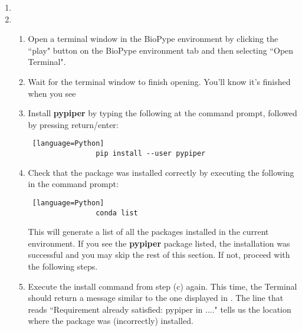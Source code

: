 \begin{enumerate}
\begin{figure}[hbtp]
\begin{center}
        \label{anaconda-install-pack}
        \end{center}
    \end{figure}
        \item {}
        \item {}
        \begin{enumerate}
            \item Open a terminal window in the BioPype environment by clicking the ``play" button on the BioPype environment tab and then selecting ``Open Terminal".
            \item Wait for the terminal window to finish opening. You'll know it's finished when you see 
            \item Install \textbf{pypiper} by typing the following at the command prompt, followed by pressing return/enter:
            \begin{lstlisting} [language=Python]
                pip install --user pypiper
            \end{lstlisting}
            \item Check that the package was installed correctly by executing the following in the command prompt:
            \begin{lstlisting} [language=Python]
                conda list
            \end{lstlisting}
            This will generate a list of all the packages installed in the current environment. If you see the \textbf{pypiper} package listed, the installation was successful and you may skip the rest of this section. If not, proceed with the following steps.
            \item Execute the install command from step (c) again. This time, the Terminal should return a message similar to the one displayed in . The line that reads ``Requirement already satisfied: pypiper in ...." tells us the location where the package was (incorrectly) installed. 

\end{enumerate}
\end{enumerate}
